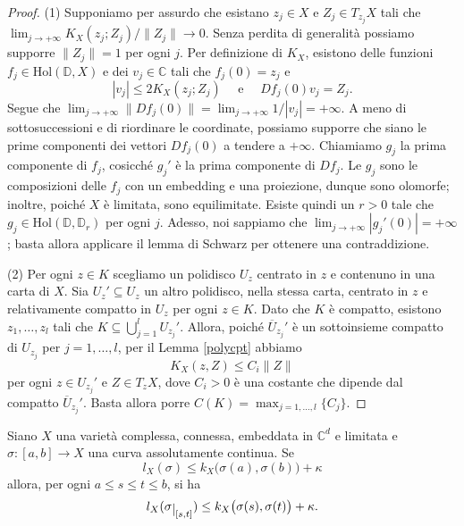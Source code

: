 \begin{proof}
    (1) Supponiamo per assurdo che esistano $z_j \in X$ e $Z_j \in T_{z_j}X$ tali che $\displaystyle \lim_{j \longrightarrow +\infty} K_X(z_j;Z_j)/\|Z_j\| \longrightarrow 0$. Senza perdita di generalità possiamo supporre $\|Z_j\|=1$ per ogni $j$. Per definizione di $K_X$, esistono delle funzioni $f_j\in\text{Hol}(\mathbb{D},X)$ e dei $v_j \in \mathbb{C}$ tali che $f_j(0)=z_j$ e
    $$|v_j| \le 2K_X(z_j;Z_j)\quad\text{ e }\quad Df_j(0)v_j=Z_j.$$
    Segue che $\displaystyle \lim_{j \longrightarrow +\infty}\|Df_j(0)\|=\lim_{j \longrightarrow +\infty}1/|v_j|=+\infty$. A meno di sottosuccessioni e di riordinare le coordinate, possiamo supporre che siano le prime componenti dei vettori $Df_j(0)$ a tendere a $+\infty$. Chiamiamo $g_j$ la prima componente di $f_j$, cosicché $g_j'$ è la prima componente di $Df_j$. Le $g_j$ sono le composizioni delle $f_j$ con un embedding e una proiezione, dunque sono olomorfe; inoltre, poiché $X$ è limitata, sono equilimitate. Esiste quindi un $r>0$ tale che $g_j \in \text{Hol}(\mathbb{D},\mathbb{D}_r)$ per ogni $j$. Adesso, noi sappiamo che $\displaystyle\lim_{j\longrightarrow +\infty} |g_j'(0)|=+\infty$; basta allora applicare il lemma di Schwarz per ottenere una contraddizione.

    (2) Per ogni $z \in K$ scegliamo un polidisco $U_z$ centrato in $z$ e contenuno in una carta di $X$. Sia $U_z'\subseteq U_z$ un altro polidisco, nella stessa carta, centrato in $z$ e relativamente compatto in $U_z$ per ogni $z \in K$. Dato che $K$ è compatto, esistono $z_1,\dots,z_l$ tali che $K\subseteq\displaystyle\bigcup_{j=1}^l U_{z_j}'$. Allora, poiché $\overline{U}_{z_j}'$ è un sottoinsieme compatto di $U_{z_j}$ per $j=1,\dots,l$, per il Lemma \ref{polycpt} abbiamo
    $$K_X(z,Z) \le C_i\|Z\|$$
    per ogni $z \in U_{z_j}'$ e $Z\in T_zX$, dove $C_i>0$ è una costante che dipende dal compatto $\overline{U}_{z_j}'$. Basta allora porre $C(K)=\displaystyle\max_{j=1,\dots,l}\{C_j\}$.
\end{proof}

\begin{lm} \label{restrdis}
    Siano $X$ una varietà complessa, connessa, embeddata in $\mathbb{C}^d$ e limitata e $\sigma:[a,b] \longrightarrow X$ una curva assolutamente continua. Se
    $$l_X(\sigma) \le k_X\big(\sigma(a),\sigma(b)\big)+\kappa$$
    allora, per ogni $a \le s \le t \le b$, si ha
    $$l_X(\sigma\restrict{[s,t]}) \le k_X\big(\sigma(s),\sigma(t)\big)+\kappa.$$
\end{lm}

